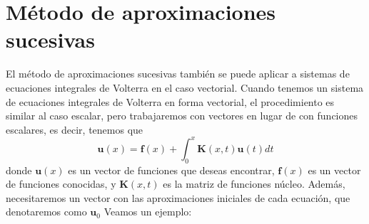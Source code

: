 \section{Método de aproximaciones sucesivas}
El método de aproximaciones sucesivas también se puede aplicar a sistemas de ecuaciones integrales de Volterra en el caso vectorial. Cuando tenemos un sistema de ecuaciones integrales de Volterra en forma vectorial, el procedimiento es similar al caso escalar, pero trabajaremos con vectores en lugar de con funciones escalares, es decir, tenemos que
\begin{equation}
	\textbf{u}(x) = \textbf{f}(x) + \int_0^x \textbf{K}(x,t)\textbf{u}(t)dt
\end{equation}
donde $\textbf{u}(x)$ es un vector de funciones que deseas encontrar, $\textbf{f}(x)$ es un vector de funciones conocidas, y $\textbf{K}(x,t)$ es la matriz de funciones núcleo. Además, necesitaremos un vector con las aproximaciones iniciales de cada ecuación, que denotaremos como $\textbf{u}_0$ Veamos un ejemplo:
